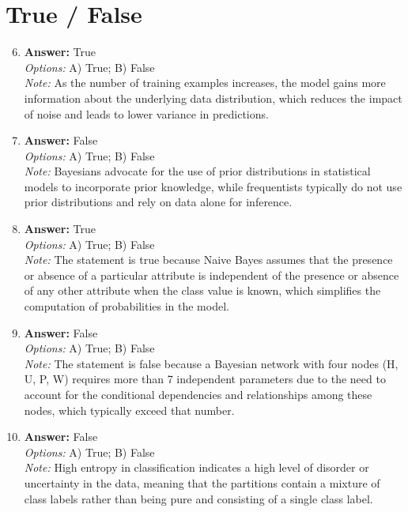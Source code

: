 \documentclass[12pt]{article}
\begin{document}
\section*{True / False}
\begin{enumerate}[label=\arabic*.]
\setcounter{enumi}{5}
\item \textbf{Answer:} True
\\ \textit{Options:} A) True; B) False
\\ \textit{Note:} As the number of training examples increases, the model gains more information about the underlying data distribution, which reduces the impact of noise and leads to lower variance in predictions.
\item \textbf{Answer:} False
\\ \textit{Options:} A) True; B) False
\\ \textit{Note:} Bayesians advocate for the use of prior distributions in statistical models to incorporate prior knowledge, while frequentists typically do not use prior distributions and rely on data alone for inference.
\item \textbf{Answer:} True
\\ \textit{Options:} A) True; B) False
\\ \textit{Note:} The statement is true because Naive Bayes assumes that the presence or absence of a particular attribute is independent of the presence or absence of any other attribute when the class value is known, which simplifies the computation of probabilities in the model.
\item \textbf{Answer:} False
\\ \textit{Options:} A) True; B) False
\\ \textit{Note:} The statement is false because a Bayesian network with four nodes (H, U, P, W) requires more than 7 independent parameters due to the need to account for the conditional dependencies and relationships among these nodes, which typically exceed that number.
\item \textbf{Answer:} False
\\ \textit{Options:} A) True; B) False
\\ \textit{Note:} High entropy in classification indicates a high level of disorder or uncertainty in the data, meaning that the partitions contain a mixture of class labels rather than being pure and consisting of a single class label.
\end{enumerate}
\end{document}
